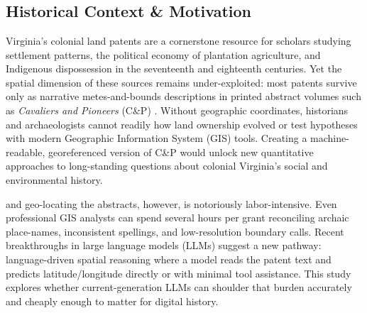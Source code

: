 \DIFaddbegin \section{}\label{introduction}

\DIFaddend \subsection{Historical Context \&
Motivation}\label{historical-context-motivation}

Virginia's colonial land patents are a cornerstone resource for scholars
studying settlement patterns, the political economy of plantation
agriculture, and Indigenous dispossession in the seventeenth and
eighteenth centuries. Yet the spatial dimension of these sources remains
under-exploited: most patents survive only as narrative metes-and-bounds
descriptions in printed abstract volumes such as \emph{Cavaliers and
Pioneers} (C\&P) \citep{Nugent1979_cavaliers3}. Without geographic
coordinates, historians and archaeologists cannot readily \DIFdelbegin {}\DIFdelend \DIFaddbegin {}\DIFaddend how
land ownership evolved or test hypotheses with modern Geographic
Information System (GIS) tools. Creating a machine-readable,
georeferenced version of C\&P would unlock new quantitative approaches
to long-standing questions about colonial Virginia's social and
environmental history.

\DIFdelbegin {}\DIFdelend \DIFaddbegin {}\DIFaddend and geo-locating the abstracts, however, is notoriously
labor-intensive. Even professional GIS analysts can spend several hours
per grant reconciling archaic place-names, inconsistent spellings, and
low-resolution boundary calls. Recent breakthroughs in large language
models (LLMs) suggest a new pathway: language-driven spatial reasoning
where a model reads the patent text and predicts latitude/longitude
directly or with minimal tool assistance. This study explores whether
current-generation LLMs can shoulder that burden accurately and cheaply
enough to matter for digital history.

\DIFaddbegin \begin{quote}

\end{quote}

